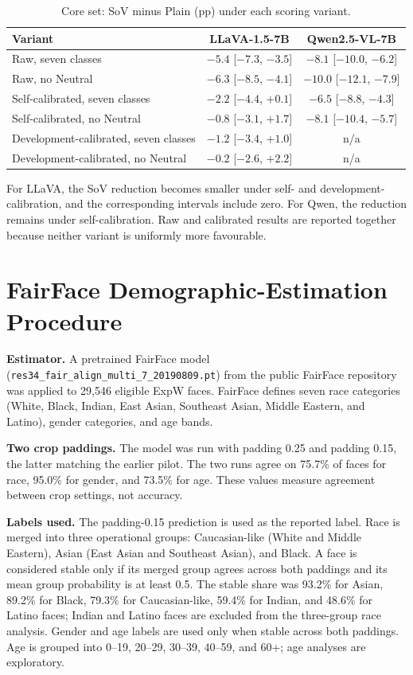 \documentclass[lettersize,journal]{IEEEtran}
\begin{document}
\begin{table}[!t]
\caption{Core set: SoV minus Plain (pp) under each scoring variant.}
\label{tab:app_sov_variants}
\centering
\scriptsize
\setlength{\tabcolsep}{3pt}
\begin{tabular}{lcc}
\toprule
Variant & LLaVA-1.5-7B & Qwen2.5-VL-7B \\
\midrule
Raw, seven classes & $-5.4$ [$-7.3$, $-3.5$] & $-8.1$ [$-10.0$, $-6.2$] \\
Raw, no Neutral & $-6.3$ [$-8.5$, $-4.1$] & $-10.0$ [$-12.1$, $-7.9$] \\
Self-calibrated, seven classes & $-2.2$ [$-4.4$, $+0.1$] & $-6.5$ [$-8.8$, $-4.3$] \\
Self-calibrated, no Neutral & $-0.8$ [$-3.1$, $+1.7$] & $-8.1$ [$-10.4$, $-5.7$] \\
Development-calibrated, seven classes & $-1.2$ [$-3.4$, $+1.0$] & n/a \\
Development-calibrated, no Neutral & $-0.2$ [$-2.6$, $+2.2$] & n/a \\
\bottomrule
\end{tabular}
\end{table}

For LLaVA, the SoV reduction becomes smaller under self- and development-calibration, and the corresponding intervals include zero. For Qwen, the reduction remains under self-calibration. Raw and calibrated results are reported together because neither variant is uniformly more favourable.

\section{FairFace Demographic-Estimation Procedure}
\label{app:fairface}
\textbf{Estimator.} A pretrained FairFace model (\texttt{res34\_fair\_align\_multi\_7\_20190809.pt}) from the public FairFace repository~\cite{karkkainen2021fairface} was applied to 29,546 eligible ExpW faces. FairFace defines seven race categories (White, Black, Indian, East Asian, Southeast Asian, Middle Eastern, and Latino), gender categories, and age bands.

\textbf{Two crop paddings.} The model was run with padding 0.25 and padding 0.15, the latter matching the earlier pilot. The two runs agree on 75.7\% of faces for race, 95.0\% for gender, and 73.5\% for age. These values measure agreement between crop settings, not accuracy.

\textbf{Labels used.} The padding-0.15 prediction is used as the reported label. Race is merged into three operational groups: Caucasian-like (White and Middle Eastern), Asian (East Asian and Southeast Asian), and Black. A face is considered stable only if its merged group agrees across both paddings and its mean group probability is at least 0.5. The stable share was 93.2\% for Asian, 89.2\% for Black, 79.3\% for Caucasian-like, 59.4\% for Indian, and 48.6\% for Latino faces; Indian and Latino faces are excluded from the three-group race analysis. Gender and age labels are used only when stable across both paddings. Age is grouped into 0--19, 20--29, 30--39, 40--59, and 60+; age analyses are exploratory.
\end{document}
